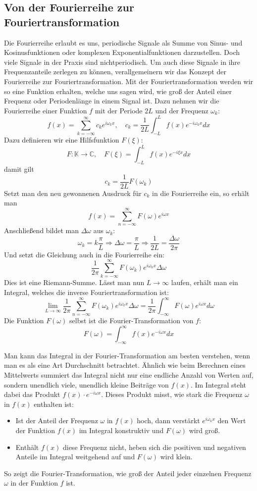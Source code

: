 \documentclass[a4paper,12pt]{article}
\theoremstyle{definition}
\theoremstyle{remark}
\begin{document}
\subsection{Von der Fourierreihe zur Fouriertransformation}
Die Fourierreihe erlaubt es uns, periodische Signale als Summe von Sinus- und Kosinusfunktionen oder komplexen Exponentialfunktionen darzustellen. Doch viele Signale in der Praxis sind nichtperiodisch. Um auch diese Signale in ihre Frequenzanteile zerlegen zu können, verallgemeinern wir das Konzept der Fourierreihe zur Fouriertransformation. Mit der Fouriertransformation werden wir so eine Funktion erhalten, welche uns sagen wird, wie groß der Anteil einer Frequenz oder Periodenlänge in einem Signal ist. Dazu nehmen wir die Fourierreihe einer Funktion $f$ mit der Periode $2L$ und der Frequenz $\omega_k$: 
$$f(x) = \sum_{k = -\infty}^{\infty}{c_k e^{i\omega_k x} }, \quad c_k = \frac{1}{2L}\int_{-L}^L{f(x) e^{-i\omega_k x} dx}$$
Dazu definieren wir eine Hilfsfunktion $F(\xi)$: 
$$F:\mathbb{K} \to \mathbb{C}, \quad F(\xi) = \int_{-L}^{L}{f(x) e^{-i \xi x} dx}$$
damit gilt
$$ c_k = \frac{1}{2L} F(\omega_k)$$
Setzt man den neu gewonnenen Ausdruck für $c_k$ in die Fourierreihe ein, so erhält man 
$$ f(x) = \sum_{n = -\infty}^{\infty}{F(\omega) e^{i\omega x}}$$
Anschließend bildet man $\Delta \omega$ aus $\omega_k$:
$$\omega_k = k \frac{\pi}{L} \Rightarrow \Delta \omega = \frac{\pi}{L} \Rightarrow \frac{1}{2L} = \frac{\Delta \omega} {2\pi}$$
Und setzt die Gleichung auch in die Fourierreihe ein: 
$$\frac{1}{2\pi} \sum_{k=-\infty}^{\infty}{F(\omega_k) e^{i \omega_k x} \Delta \omega}$$
Dies ist eine Riemann-Summe. Lässt man nun $L \to \infty$ laufen, erhält man ein Integral, welches die inverse Fouriertransformation ist:
$$\lim_{L\to\infty} {\frac{1}{2\pi}\sum_{n = -\infty}^\infty{F(\omega_k) e^{i \omega_k x}\Delta \omega}} = \frac {1}{2\pi} \int_{-\infty}^{\infty}{F(\omega)e^{i \omega x} d\omega}$$
Die Funktion $F(\omega)$ selbst ist die Fourier-Transformation von $f$:
$$F(\omega) = \int_{-\infty}^{\infty}{f(x) e^{-i\omega x} dx}$$

Man kann das Integral in der Fourier-Transformation am besten verstehen, wenn man es 
als eine Art Durchschnitt betrachtet. Ähnlich wie beim Berechnen eines Mittelwerts 
summiert das Integral nicht nur eine endliche Anzahl von Werten auf, sondern unendlich viele, 
unendlich kleine Beiträge von $f(x)$. Im Integral steht dabei das Produkt $f(x) \cdot e^{-i\omega x}$.
Dieses Produkt misst, wie stark die Frequenz $\omega$ in $f(x)$ enthalten ist:
\begin{itemize}
    \item Ist der Anteil der Frequenz $\omega$ in $f(x)$ hoch, dann verstärkt $e^{i\omega_kx}$ den Wert der Funktion $f(x)$
    im Integral konstruktiv und $F(\omega)$ wird groß.
    \item Enthält $f(x)$ diese Frequenz nicht, heben sich die positiven und negativen Anteile 
    im Integral weitgehend auf und $F(\omega)$ wird klein.
  \end{itemize}
So zeigt die Fourier-Transformation, wie groß der Anteil jeder einzelnen Frequenz $\omega$ 
in der Funktion $f$ ist.
\end{document}
